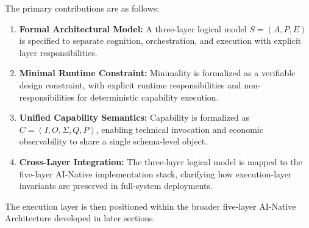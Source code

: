 The primary contributions are as follows:
\begin{enumerate}[label=\arabic*.]
    \item \textbf{Formal Architectural Model:} A three-layer logical model $S = (A, P, E)$ is specified to separate cognition, orchestration, and execution with explicit layer responsibilities.
    \item \textbf{Minimal Runtime Constraint:} Minimality is formalized as a verifiable design constraint, with explicit runtime responsibilities and non-responsibilities for deterministic capability execution.
    \item \textbf{Unified Capability Semantics:} Capability is formalized as $C = (I, O, \Sigma, Q, P)$, enabling technical invocation and economic observability to share a single schema-level object.
    \item \textbf{Cross-Layer Integration:} The three-layer logical model is mapped to the five-layer AI-Native implementation stack, clarifying how execution-layer invariants are preserved in full-system deployments.
\end{enumerate}

The execution layer is then positioned within the broader five-layer AI-Native Architecture developed in later sections.

